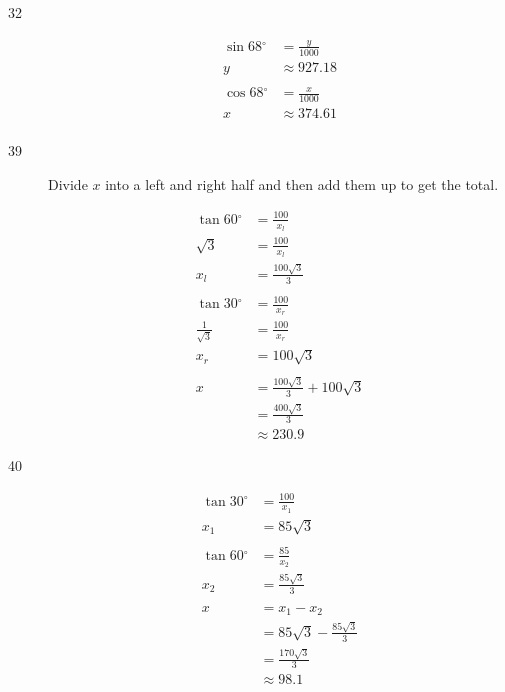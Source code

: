 \documentclass{exam}
\newcommand{\dg}{\ensuremath{^\circ}}
\begin{document}
\begin{description}
      \item[32]
        \begin{align*}
          \sin 68 \dg & = \frac{y}{1000} \\
          y           & \approx \boxed{ 927.18 } \\
          \\
          \cos 68 \dg & = \frac{x}{1000} \\
          x           & \approx \boxed{ 374.61 } \\
        \end{align*}

      \pagebreak

      \item[39]
        Divide $x$ into a left and right half and then add them up to get the total.

        \begin{align*}
          \tan 60 \dg & = \frac{100}{x_l} \\
          \sqrt{3}    & = \frac{100}{x_l} \\
          x_l         & = \frac{100 \sqrt{3}}{3} \\
          \\
          \tan 30 \dg        & = \frac{100}{x_r} \\
          \frac{1}{\sqrt{3}} & = \frac{100}{x_r} \\
          x_r                & = 100 \sqrt{3} \\
          \\
          x & = \frac{100 \sqrt{3}}{3} + 100 \sqrt{3} \\
            & = \frac{400 \sqrt{3}}{3} \\
            & \approx \boxed{ 230.9 }
        \end{align*}

      \item[40]
        \begin{align*}
          \tan 30 \dg & = \frac{100}{x_1} \\
          x_1         & = 85 \sqrt{3} \\
          \\
          \tan 60 \dg & = \frac{85}{x_2} \\
          x_2         & = \frac{85 \sqrt{3}}{3} \\
          \\
          x  & = x_1 - x_2 \\
             & = 85 \sqrt{3} - \frac{85 \sqrt{3}}{3} \\
             & = \frac{170 \sqrt{3}}{3} \\
             & \approx \boxed{ 98.1 } \\
        \end{align*}


\end{description}
\end{document}
